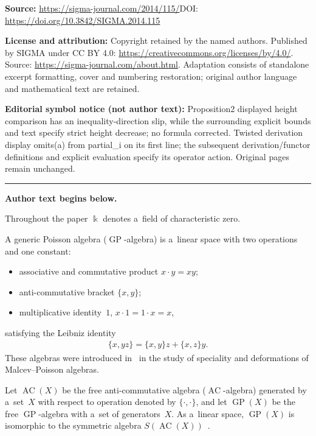 \documentclass[11pt]{article}
\begin{document}
\noindent\textbf{Source:} \url{https://sigma-journal.com/2014/115/}\quad DOI: \url{https://doi.org/10.3842/SIGMA.2014.115}\par
\noindent\textbf{License and attribution:} Copyright retained by the named authors. Published by SIGMA under CC BY 4.0: \url{https://creativecommons.org/licenses/by/4.0/}. Source: \url{https://sigma-journal.com/about.html}. Adaptation consists of standalone excerpt formatting, cover and numbering restoration; original author language and mathematical text are retained.\par
\noindent\textbf{Editorial symbol notice (not author text):} Proposition2 displayed height comparison has an inequality-direction slip, while the surrounding explicit bounds and text specify strict height decrease; no formula corrected. Twisted derivation display omits(a) from partial\_i on its first line; the subsequent derivation/functor definitions and explicit evaluation specify its operator action. Original pages remain unchanged.\par
\medskip\hrule\medskip\noindent\textbf{Author text begins below.}\par
\setcounter{section}{1}
\setcounter{subsection}{0}
\setcounter{subsubsection}{0}
\setcounter{equation}{0}
Throughout the paper $\Bbbk $ denotes a~f\/ield of characteristic zero.

A generic Poisson algebra ($\operatorname{GP}$-algebra) is a~linear space with two operations and one constant:
\begin{itemize}\itemsep=0pt
\item associative and commutative product $x\cdot y = xy$;
\item anti-commutative bracket $\{x,y \}$;
\item multiplicative identity~$1$, $x\cdot 1 = 1\cdot x = x$,
\end{itemize}
satisfying the Leibniz identity
\begin{gather*}
\{x,yz\} = \{x,y\}z + \{x,z\}y.
\end{gather*}
These algebras were introduced in~\cite{Shest2000} in the study of speciality and deformations of Malcev--Poisson
algebras.

Let $\operatorname{AC}(X)$ be the free anti-commutative algebra ($\operatorname{AC}$-algebra) generated by a~set~$X$ with respect to operation denoted
by $\{\cdot,\cdot\}$, and let $\operatorname{GP}(X)$ be the free $\operatorname{GP}$-algebra with a~set of generators~$X$.
As a~linear space, $\operatorname{GP}(X)$ is isomorphic to the symmetric algebra $S(\operatorname{AC}(X))$~\cite{Shest1993}.
\end{document}
